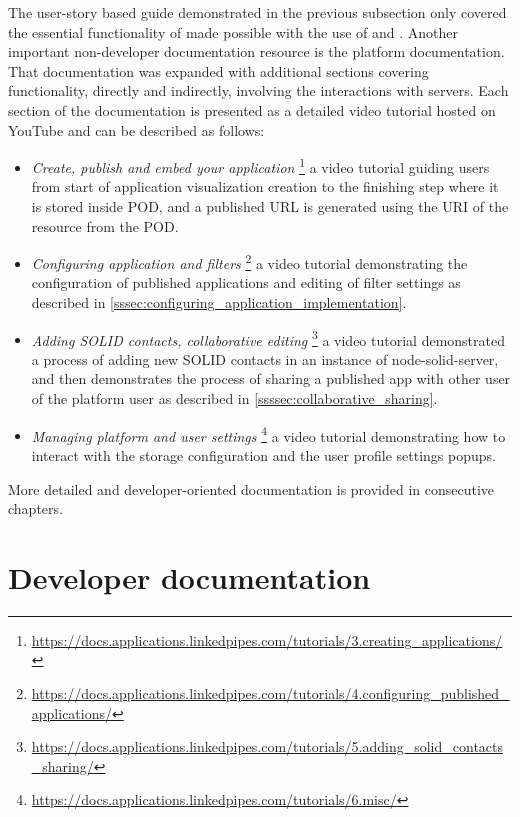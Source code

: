 The user-story based guide demonstrated in the previous subsection only covered the essential functionality of \lpa{} made possible with the use of \lpas{} and \solid{}. Another important non-developer documentation resource is the \lpa{} platform documentation. That documentation was expanded with additional sections covering functionality, directly and indirectly, involving the interactions with \solid{} servers. Each section of the documentation is presented as a detailed video tutorial hosted on YouTube and can be described as follows:

\begin{itemize}
    \item \textit{Create, publish and embed your application} \footnote{\url{https://docs.applications.linkedpipes.com/tutorials/3.creating_applications/}} a video tutorial guiding users from start of application visualization creation to the finishing step where it is stored inside \solid{} POD, and a published URL is generated using the URI of the resource from the POD.
    \item \textit{Configuring application and filters} \footnote{\url{https://docs.applications.linkedpipes.com/tutorials/4.configuring_published_applications/}} a video tutorial demonstrating the configuration of published applications and editing of filter settings as described in \autoref{sssec:configuring_application_implementation}.
    \item \textit{Adding SOLID contacts, collaborative editing} \footnote{\url{https://docs.applications.linkedpipes.com/tutorials/5.adding_solid_contacts_sharing/}} a video tutorial demonstrated a process of adding new SOLID contacts in an instance of node-solid-server, and then demonstrates the process of sharing a published app with other user of the platform user as described in \autoref{ssssec:collaborative_sharing}.
    \item \textit{Managing platform and user settings} \footnote{\url{https://docs.applications.linkedpipes.com/tutorials/6.misc/}} a video tutorial demonstrating how to interact with the storage configuration and the \solid{} user profile settings popups. 
\end{itemize} 

More detailed and developer-oriented documentation is provided in consecutive chapters.

\section{Developer documentation}

